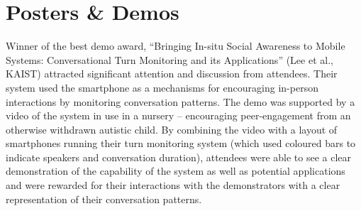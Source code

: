 \section{Posters \& Demos}
\label{sec:postersdemos}
Winner of the best demo award, ``Bringing In-situ Social Awareness to Mobile 
Systems: Conversational Turn Monitoring and its Applications'' (Lee et al., 
KAIST) attracted significant attention and discussion from attendees. Their 
system used the smartphone as a mechanisms for encouraging in-person interactions
by monitoring conversation patterns. The demo was supported by a video of the 
system in use in a nursery -- encouraging peer-engagement from an otherwise 
withdrawn autistic child. By combining the video with a layout of smartphones 
running their turn monitoring system (which used coloured bars to indicate 
speakers and conversation duration), attendees were able to see a clear 
demonstration of the capability of the system as well as potential applications
and were rewarded for their interactions with the demonstrators with a clear
representation of their conversation patterns.


